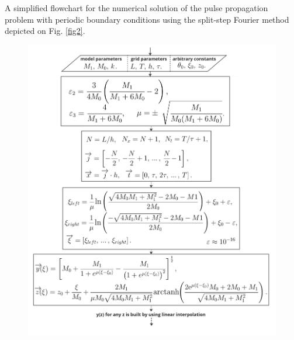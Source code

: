 \documentclass[preprint,12pt]{elsarticle}
\begin{document}
A simplified flowchart for the numerical solution of the pulse propagation problem with periodic boundary conditions using the split-step Fourier method depicted on Fig. \ref{fig2}. 
\begin{figure}[H]
\begin{center}
\begin{minipage}[h]{0.48\linewidth} %
\includegraphics[width=1\linewidth]{fig2.png}
\end{minipage}
\hfill
\begin{minipage}[h]{0.48\linewidth}

\end{minipage}
\end{center}
\end{figure}
\end{document}
